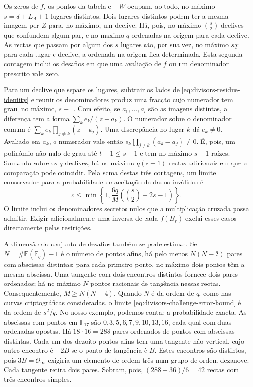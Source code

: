 Os zeros de \(f\), os pontos da tabela e \(-W\) ocupam, ao todo,
no máximo \(s=d+L_A+1\) lugares distintos. Dois lugares distintos
podem ter a mesma imagem por \(Z\) para, no máximo, um declive.
Há, pois, no máximo \(\binom{s}{2}\) declives que confundem algum
par, e no máximo \(q\) ordenadas na origem para cada declive.
As rectas que passam por algum dos \(s\) lugares são, por sua vez,
no máximo \(sq\): para cada lugar e declive, a ordenada na origem
fica determinada. Esta segunda contagem inclui os desafios em que
uma avaliação de \(f\) ou um denominador prescrito vale zero.

Para um declive que separe os lugares, subtrair os lados de
\eqref{eq:divisors-residue-identity} e reunir os denominadores produz
uma fracção cujo numerador tem grau, no máximo, \(s-1\).
Com efeito, se \(a_1,\ldots,a_t\) são as imagens distintas,
a diferença tem a forma \(\sum_k e_k/(z-a_k)\). O numerador sobre
o denominador comum é \(\sum_k e_k\prod_{j\ne k}(z-a_j)\).
Uma discrepância no lugar \(k\) dá \(e_k\ne0\). Avaliado em
\(a_k\), o numerador vale então
\(e_k\prod_{j\ne k}(a_k-a_j)\ne0\). É, pois, um polinómio
não nulo de grau até \(t-1\leq s-1\) e tem no máximo
\(s-1\) raízes. Somando sobre os
\(q\) declives, há no máximo \(q(s-1)\) rectas adicionais em
que a comparação pode coincidir. Pela soma destas três contagens,
um limite conservador para a probabilidade de aceitação de dados
inválidos é
\begin{equation}
 \varepsilon\leq
 \min\left\{1,\frac{6q}{M}
       \left(\binom{s}{2}+2s-1\right)\right\}.
 \label{eq:divisors-challenge-error-bound}
\end{equation}
O limite inclui os denominadores secretos nulos que a multiplicação
cruzada possa admitir. Exigir adicionalmente uma inversa de cada
\(f(B_r)\) exclui esses casos directamente pelas restrições.

A dimensão do conjunto de desafios também se pode estimar. Se
\(N=\#\mathbb E(\mathbb F_q)-1\) é o número de pontos afins,
há pelo menos \(N(N-2)\) pares com abscissas distintas: para cada
primeiro ponto, no máximo dois pontos têm a mesma abscissa. Uma
tangente com dois encontros distintos fornece dois pares ordenados;
há no máximo \(N\) pontos racionais de tangência nessas rectas.
Consequentemente, \(M\geq N(N-4)\). Quando \(N\) é da ordem
de \(q\), como nas curvas criptográficas consideradas, o limite
\eqref{eq:divisors-challenge-error-bound} é da ordem de \(s^2/q\).
No nosso exemplo, podemos contar a probabilidade exacta. As abscissas
com pontos em \(\mathbb F_{17}\) são \(0,3,5,6,7,9,10,13,16\),
cada qual com duas ordenadas opostas. Há \(18\cdot16=288\) pares
ordenados de pontos com abscissas distintas. Cada um dos dezoito pontos afins
tem uma tangente não vertical, cujo outro encontro é \(-2B\) se o
ponto de tangência é \(B\). Estes encontros são distintos, pois
\(3B=\mathcal O_\infty\) exigiria um elemento de ordem três num
grupo de ordem dezanove. Cada tangente retira dois pares.
Sobram, pois, \((288-36)/6=42\) rectas com três encontros simples.

